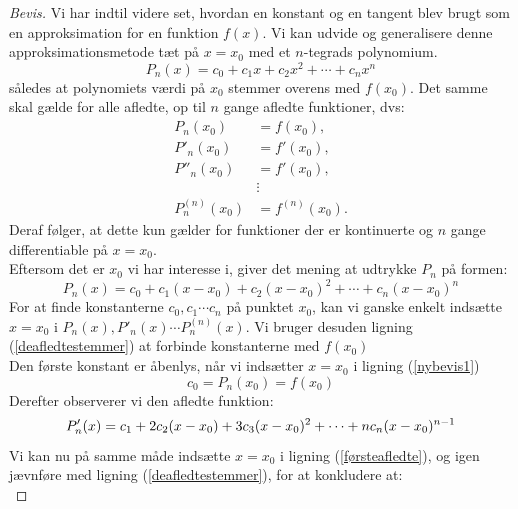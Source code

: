 \documentclass[12pt, a4paper]{article}
\begin{document}
\begin{refsection}
\begin{proof}[Bevis]
Vi har indtil videre set, hvordan en konstant og en tangent blev brugt som en approksimation for en funktion $f(x)$. Vi kan udvide og generalisere denne approksimationsmetode tæt på $x=x_0$ med et  $n$-tegrads polynomium.\\
\begin{equation*}
P_n(x)=c_0+c_1x+c_2x^2+ \cdots +c_nx^n
\end{equation*}
således at polynomiets værdi på $x_0$ stemmer overens med  $f(x_0)$. Det samme skal gælde for alle afledte, op til $n$ gange afledte funktioner, dvs:
 \begin{equation}\label{deafledtestemmer}
     \begin{aligned}
         P_n(x_0)&=f(x_0),\\
         P'_n(x_0)&=f'(x_0),\\
         P''_n(x_0)&=f'(x_0),\\
                   &\vdots\\
         P^{(n)}_n(x_0)&=f^{(n)}(x_0).
     \end{aligned}
\end{equation}
Deraf følger, at dette kun gælder for funktioner der er kontinuerte og $n$ gange differentiable på $x=x_0$.\\
Eftersom det er $x_0$ vi har interesse i, giver det mening at udtrykke  $P_n$ på formen:
\begin{equation}\label{nybevis1}
   P_n(x)=c_0+c_1(x-x_0)+c_2(x-x_0)^2+\cdots+c_n(x-x_0)^n 
\end{equation}
For at finde konstanterne $c_0, c_1 \cdots c_n$ på punktet $x_0$, kan vi ganske enkelt indsætte $x=x_0$ i $P_n(x), P'_n(x) \cdots P^{(n)}_n(x)$. Vi bruger desuden ligning (\ref{deafledtestemmer}) at forbinde konstanterne med $f(x_0)$\\
Den første konstant er åbenlys, når vi indsætter $x=x_0$ i ligning (\ref{nybevis1})
 \begin{equation*}
    c_0=P_n(x_0)=f(x_0)
\end{equation*}
Derefter observerer vi den afledte funktion: 
\begin{equation}\label{førsteafledte}
        P'_n(x)=c_1+2c_2(x-x_0)+3c_3(x-x_0)^2+\cdots+nc_n(x-x_0)^{n-1}\\
\end{equation}
Vi kan nu på samme måde indsætte $x=x_0$ i ligning (\ref{førsteafledte}), og igen jævnføre med ligning (\ref{deafledtestemmer}), for at konkludere at:
\begin{equation*}

\end{equation*}
\end{proof}
\end{refsection}
\end{document}
